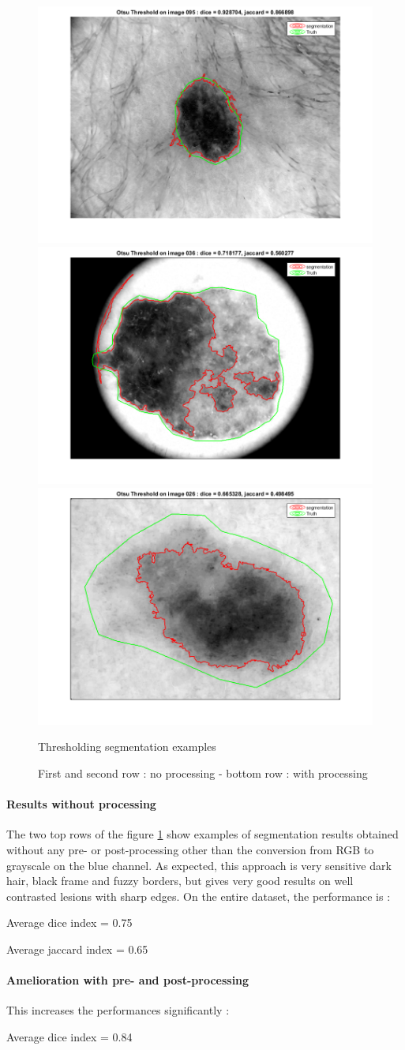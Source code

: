 \documentclass[a4paper,10pt]{article}
\begin{document}
\begin{figure}[h]
	\includegraphics[width=0.32\linewidth]{../results/otsu/otsu-095}
	\includegraphics[width=0.32\linewidth]{../results/otsu/otsu-036}
	\includegraphics[width=0.32\linewidth]{../results/otsu/otsu-026}
	\caption{Thresholding segmentation examples}
	\caption*{First and second row : no processing - bottom row : with processing}
	\label{fig:otsu-ex}
\end{figure}

\paragraph{Results without processing} 
The two top rows of the figure \ref{fig:otsu-ex} show examples of segmentation results obtained without any pre- or post-processing other than the conversion from RGB to grayscale on the blue channel. As expected, this approach is very sensitive dark hair, black frame and fuzzy borders, but gives very good results on well contrasted lesions with sharp edges. On the entire dataset, the performance is :

Average dice index = 0.75

Average jaccard index = 0.65



\paragraph{Amelioration with pre- and post-processing} This increases the performances significantly :

Average dice index = 0.84
\end{document}
